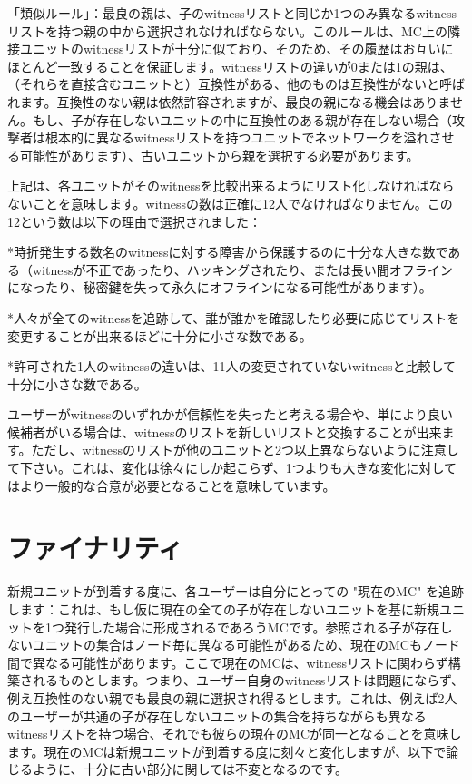 \documentclass[a4paper, dvipdfmx]{jsarticle}
\begin{document}
「類似ルール」：最良の親は、子のwitnessリストと同じか1つのみ異なるwitnessリストを持つ親の中から選択されなければならない。このルールは、MC上の隣接ユニットのwitnessリストが十分に似ており、そのため、その履歴はお互いにほとんど一致することを保証します。witnessリストの違いが0または1の親は、（それらを直接含むユニットと）互換性がある、他のものは互換性がないと呼ばれます。互換性のない親は依然許容されますが、最良の親になる機会はありません。もし、子が存在しないユニットの中に互換性のある親が存在しない場合（攻撃者は根本的に異なるwitnessリストを持つユニットでネットワークを溢れさせる可能性があります）、古いユニットから親を選択する必要があります。

上記は、各ユニットがそのwitnessを比較出来るようにリスト化しなければならないことを意味します。witnessの数は正確に12人でなければなりません。この12という数は以下の理由で選択されました：

*時折発生する数名のwitnessに対する障害から保護するのに十分な大きな数である（witnessが不正であったり、ハッキングされたり、または長い間オフラインになったり、秘密鍵を失って永久にオフラインになる可能性があります）。

*人々が全てのwitnessを追跡して、誰が誰かを確認したり必要に応じてリストを変更することが出来るほどに十分に小さな数である。

*許可された1人のwitnessの違いは、11人の変更されていないwitnessと比較して十分に小さな数である。

ユーザーがwitnessのいずれかが信頼性を失ったと考える場合や、単により良い候補者がいる場合は、witnessのリストを新しいリストと交換することが出来ます。ただし、witnessのリストが他のユニットと2つ以上異ならないように注意して下さい。これは、変化は徐々にしか起こらず、1つよりも大きな変化に対してはより一般的な合意が必要となることを意味しています。

\section{ファイナリティ}
新規ユニットが到着する度に、各ユーザーは自分にとっての "現在のMC" を追跡します：これは、もし仮に現在の全ての子が存在しないユニットを基に新規ユニットを1つ発行した場合に形成されるであろうMCです。参照される子が存在しないユニットの集合はノード毎に異なる可能性があるため、現在のMCもノード間で異なる可能性があります。ここで現在のMCは、witnessリストに関わらず構築されるものとします。つまり、ユーザー自身のwitnessリストは問題にならず、例え互換性のない親でも最良の親に選択され得るとします。これは、例えば2人のユーザーが共通の子が存在しないユニットの集合を持ちながらも異なるwitnessリストを持つ場合、それでも彼らの現在のMCが同一となることを意味します。現在のMCは新規ユニットが到着する度に刻々と変化しますが、以下で論じるように、十分に古い部分に関しては不変となるのです。
\end{document}
